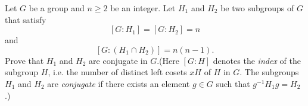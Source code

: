 \documentclass{article}
\begin{document}
\setlength{\parindent}{0pt}
Let \(\displaystyle G\) be a group and \(\displaystyle n\ge2\) be an integer. Let \(\displaystyle H_1\) and \(\displaystyle H_2\) be two subgroups of \(\displaystyle G\) that satisfy$$[G:H_1]=[G:H_2]=n$$and$$[G:(H_1\cap H_2)]=n(n-1).$$Prove that \(\displaystyle H_1\) and \(\displaystyle H_2\) are conjugate in \(\displaystyle G\).\newline (Here \(\displaystyle [G:H]\) denotes the \emph{index} of the subgroup \(\displaystyle H\), i.e. the number of distinct left cosets \(\displaystyle xH\) of \(\displaystyle H\) in \(\displaystyle G\). The subgroups \(\displaystyle H_1\) and \(\displaystyle H_2\) are \emph{conjugate} if there exists an element \(\displaystyle g\in G\) such that \(\displaystyle g^{-1}H_1g=H_2\).) 
\end{document}
